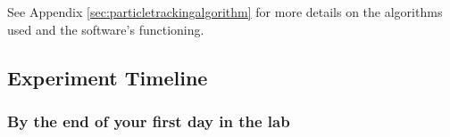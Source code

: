 \documentclass{../lab}
\begin{document}
See Appendix \ref{sec:particletrackingalgorithm} for more details on the algorithms used and the software's functioning.

\subsection{Experiment Timeline}

\subsubsection{By the end of your first day in the lab}

\begin{enumerate}

    

    
    
    

\end{enumerate}
\end{document}
